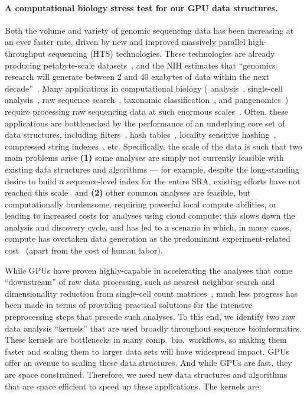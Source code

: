 \paragraph{A computational biology stress test for our GPU data structures.}
Both the volume and variety of genomic sequencing data has been increasing at an ever faster rate, driven by new and improved massively parallel high-throughput sequencing (HTS) technologies.  These technologies are already producing
petabyte-scale datasets~\cite{kodama2012sequence}, and the NIH estimates that ``genomics research will generate between 2 and 40 exabytes of data within the next decade''~\cite{NHGRIDataScience}. Many applications in computational biology (\kmer
analysis~\cite{MarccaisKi11}, single-cell analysis~\cite{he2022alevin}, raw sequence search~\cite{solomon2016fast}, taxonomic classification~\cite{wood2014kraken}, and pangenomics~\cite{computational2018computational})
require processing raw sequencing data at such enormous scales~\cite{kodama2012sequence}. 
%
Often, these applications are bottlenecked by the performance of an underlying core set of data structures, including filters~\cite{PandeyAlBe18, solomon2016fast}, hash tables~\cite{solomon2016fast,almodaresi2022incrementally}, locality sensitive hashing~\cite{Marais2019}, compressed string indexes~\cite{Almodaresi2018Pufferfish}, etc. %
Specifically, the scale of the data is such that two main problems arise \textbf{(1)} some analyses are simply not currently feasible with existing data structures and algorithms --- for example, despite the long-standing desire to build a sequence-level index for the entire SRA, existing efforts have not reached this scale~\cite{Karasikov2020, HarrisM20, SolomonK17, almodaresi2022incrementally, AlmodaresiPFJP20,PandeyAlBe18} and \textbf{(2)} other common analyses are feasible, but computationally burdensome, requiring powerful local compute abilities, or leading to increased costs for analyses using cloud compute; this slows down the analysis and discovery cycle, and has led to a scenario in which, in many cases, compute has overtaken data generation as the predominant experiment-related cost~\cite{Muir_2016} (apart from the cost of human labor). 

While GPUs have proven highly-capable in accelerating the analyses that come ``downstream'' of raw data processing, such as nearest neighbor search and dimensionality reduction from single-cell count matrices~\cite{RAPIDS:2022}, much less progress has been made in terms of providing practical solutions for the intensive preprocessing steps that precede such analyses.  To this end, we identify two raw data analysis ``kernels'' that are used broadly throughout sequence bioinformatics. These kernels are bottlenecks in many comp.~bio.~workflows, so making them faster and scaling them to larger data sets will have widespread impact. GPUs offer an avenue to scaling these data structures.  And while GPUs are fast, they are space constrained.  Therefore, we need new data structures and algorithms that are space efficient to speed up these applications.  
%
The kernels are:

